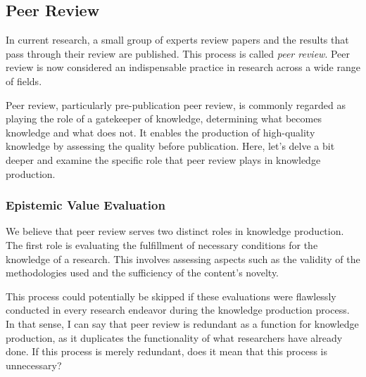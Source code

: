 \documentclass{book}
\begin{document}




\subsection{Peer Review}
In current research, a small group of experts review papers and the results that pass through their review are published. This process is called \textit{peer review}. Peer review is now considered an indispensable practice in research across a wide range of fields.

Peer review, particularly pre-publication peer review, is commonly regarded as playing the role of a gatekeeper of knowledge, determining what becomes knowledge and what does not. It enables the production of high-quality knowledge by assessing the quality before publication. Here, let's delve a bit deeper and examine the specific role that peer review plays in knowledge production.

\subsubsection{Epistemic Value Evaluation}

We believe that peer review serves two distinct roles in knowledge production. The first role is evaluating the fulfillment of necessary conditions for the knowledge of a research. This involves assessing aspects such as the validity of the methodologies used and the sufficiency of the content's novelty. 

This process could potentially be skipped if these evaluations were flawlessly conducted in every research endeavor during the knowledge production process. In that sense, I can say that peer review is redundant as a function for knowledge production, as it duplicates the functionality of what researchers have already done. If this process is merely redundant, does it mean that this process is unnecessary?
\end{document}
